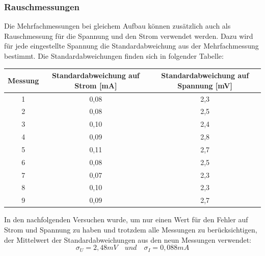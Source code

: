 \documentclass[12pt,a4paper]{article}
\begin{document}
\subsubsection{Rauschmessungen}
Die Mehrfachmessungen bei gleichem Aufbau können zusätzlich auch als Rauschmessung für die Spannung und den Strom verwendet werden. Dazu wird für jede eingestellte Spannung die Standardabweichung aus der Mehrfachmessung bestimmt. Die Standardabweichungen finden sich in folgender Tabelle: \\
\begin{center}
\begin{tabular}{|c|c|c|}
\hline 
Messung & Standardabweichung auf Strom [mA] & Standardabweichung auf Spannung [mV] \\ 
\hline 
1 & 0,08 & 2,3 \\ 
\hline 
2 & 0,08 & 2,5 \\ 
\hline 
3 & 0,10 & 2,4 \\ 
\hline 
4 & 0,09 & 2,8 \\ 
\hline 
5 & 0,11 & 2,7 \\ 
\hline 
6 & 0,08 & 2,5 \\ 
\hline 
7 & 0,07 & 2,3 \\ 
\hline 
8 & 0,10 & 2,3 \\ 
\hline 
9 & 0,09 & 2,7 \\ 
\hline 
\end{tabular}
\end{center}
In den nachfolgenden Versuchen wurde, um nur einen Wert für den Fehler auf Strom und Spannung zu haben und trotzdem alle Messungen zu berücksichtigen, der Mittelwert der Standardabweichungen aus den neun Messungen verwendet:
\[\sigma_U = 2,48 mV \quad und \quad \sigma_I = 0,088 mA \]
\end{document}
